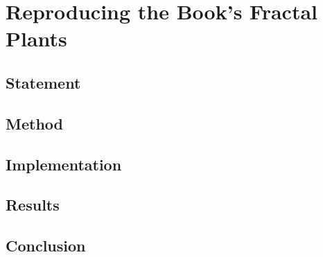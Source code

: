 \section{Reproducing the Book's Fractal Plants}

\subsection{Statement}
\subsection{Method}
\subsection{Implementation}
\subsection{Results}
\subsection{Conclusion}
